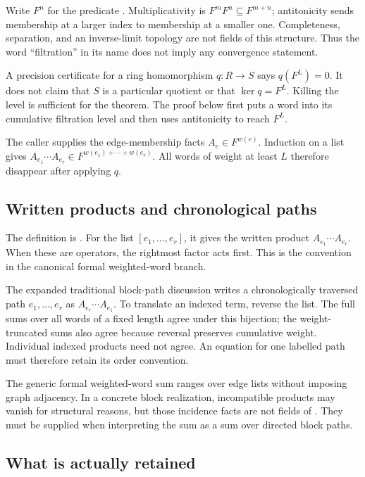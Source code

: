 Write $F^n$ for the predicate . Multiplicativity is $F^mF^n\subseteq F^{m+n}$; antitonicity sends membership at a larger index to membership at a smaller one. Completeness, separation, and an inverse-limit topology are not fields of this structure. Thus the word ``filtration'' in its name does not imply any convergence statement.

A precision certificate for a ring homomorphism $q:R\to S$ says $q(F^L)=0$. It does not claim that $S$ is a particular quotient or that $\ker q=F^L$. Killing the level is sufficient for the theorem. The proof below first puts a word into its cumulative filtration level and then uses antitonicity to reach $F^L$.

The caller supplies the edge-membership facts $A_e\in F^{w(e)}$. Induction on a list gives $A_{e_1}\cdots A_{e_r}\in F^{w(e_1)+\cdots+w(e_r)}$. All words of weight at least $L$ therefore disappear after applying $q$.

\subsection{Written products and chronological paths}

The definition  is . For the list $[e_1,\ldots,e_r]$, it gives the written product $A_{e_1}\cdots A_{e_r}$. When these are operators, the rightmost factor acts first. This is the convention in the canonical formal weighted-word branch.

The expanded traditional block-path discussion writes a chronologically traversed path $e_1,\ldots,e_r$ as $A_{e_r}\cdots A_{e_1}$. To translate an indexed term, reverse the list. The full sums over all words of a fixed length agree under this bijection; the weight-truncated sums also agree because reversal preserves cumulative weight. Individual indexed products need not agree. An equation for one labelled path must therefore retain its order convention.

The generic formal weighted-word sum ranges over edge lists without imposing graph adjacency. In a concrete block realization, incompatible products may vanish for structural reasons, but those incidence facts are not fields of . They must be supplied when interpreting the sum as a sum over directed block paths.

\subsection{What is actually retained}


